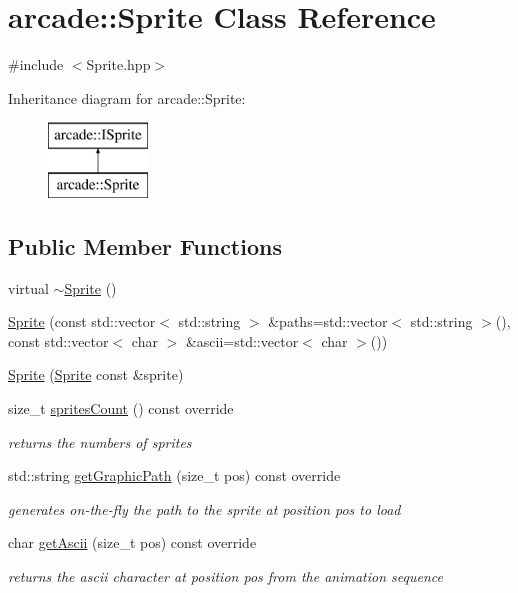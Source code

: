 \hypertarget{classarcade_1_1_sprite}{}\section{arcade\+:\+:Sprite Class Reference}
\label{classarcade_1_1_sprite}


{\ttfamily \#include $<$Sprite.\+hpp$>$}

Inheritance diagram for arcade\+:\+:Sprite\+:\begin{figure}[H]
\begin{center}
\leavevmode
\includegraphics[height=2.000000cm]{classarcade_1_1_sprite}
\end{center}
\end{figure}
\subsection*{Public Member Functions}
\begin{DoxyCompactItemize}
\item 
virtual \hyperlink{classarcade_1_1_sprite_a8e523ec675ab75663ba3fc33743aeb72}{$\sim$\+Sprite} ()
\item 
\hyperlink{classarcade_1_1_sprite_a76833e28f549047d648f2b12694aa6df}{Sprite} (const std\+::vector$<$ std\+::string $>$ \&paths=std\+::vector$<$ std\+::string $>$(), const std\+::vector$<$ char $>$ \&ascii=std\+::vector$<$ char $>$())
\item 
\hyperlink{classarcade_1_1_sprite_ae7194e727354e7b6fd208e0cb72887b4}{Sprite} (\hyperlink{classarcade_1_1_sprite}{Sprite} const \&sprite)
\item 
size\+\_\+t \hyperlink{classarcade_1_1_sprite_a99cc47358f32492ea89659b6b92f4d4c}{sprites\+Count} () const override
\begin{DoxyCompactList}\small\item\em returns the numbers of sprites \end{DoxyCompactList}\item 
std\+::string \hyperlink{classarcade_1_1_sprite_ad8f344724f99ad369c8c552274fface7}{get\+Graphic\+Path} (size\+\_\+t pos) const override
\begin{DoxyCompactList}\small\item\em generates on-\/the-\/fly the path to the sprite at position pos to load \end{DoxyCompactList}\item 
char \hyperlink{classarcade_1_1_sprite_a168a7f537e0fc6d2d4596cab449fde2c}{get\+Ascii} (size\+\_\+t pos) const override
\begin{DoxyCompactList}\small\item\em returns the ascii character at position pos from the animation sequence \end{DoxyCompactList}\end{DoxyCompactItemize}


